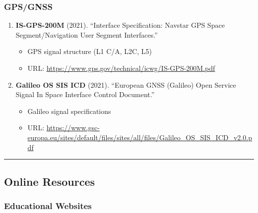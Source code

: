 \subsubsection{GPS/GNSS}\label{gpsgnss}

\begin{enumerate}
\def\labelenumi{\arabic{enumi}.}
\setcounter{enumi}{33}
\tightlist
\item
  \textbf{IS-GPS-200M} (2021). ``Interface Specification: Navstar GPS
  Space Segment/Navigation User Segment Interfaces.''

  \begin{itemize}
  \tightlist
  \item
    GPS signal structure (L1 C/A, L2C, L5)
  \item
    URL: \url{https://www.gps.gov/technical/icwg/IS-GPS-200M.pdf}
  \end{itemize}
\item
  \textbf{Galileo OS SIS ICD} (2021). ``European GNSS (Galileo) Open
  Service Signal In Space Interface Control Document.''

  \begin{itemize}
  \tightlist
  \item
    Galileo signal specifications
  \item
    URL: \url{https://www.gsc-europa.eu/sites/default/files/sites/all/files/Galileo_OS_SIS_ICD_v2.0.pdf}
  \end{itemize}
\end{enumerate}

\begin{center}\rule{0.5\linewidth}{0.5pt}\end{center}

\subsection{\texorpdfstring{ Online
Resources}{ Online Resources}}\label{online-resources}

\subsubsection{Educational Websites}\label{educational-websites}

